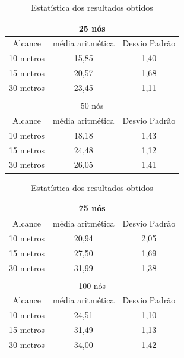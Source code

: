 	\begin{table}[!htb]
	    \caption{Estatística dos resultados obtidos}
	    \label{tab:estatiscaResultadosObtidosComInfraestrutura}
	    \centering
	    \scriptsize
	    \begin{minipage}{.5\linewidth}
	      
	      \centering
	        \begin{tabular}{|c|c|c|}

			\hline
			\multicolumn{3}{|c|}{25 nós} \\ \hline
			Alcance   & média aritmética &	Desvio Padrão   \\ \hline
			10 metros &	15,85 & 1,40   \\ \hline
			15 metros &	20,57 & 1,68   \\ \hline
			30 metros &	23,45 & 1,11  \\ \hline

			\multicolumn{3}{|c|}{} \\ \hline

			\multicolumn{3}{|c|}{50 nós} \\ \hline
			Alcance   & média aritmética &	Desvio Padrão   \\ \hline
			10 metros &	18,18 & 1,43   \\ \hline
			15 metros &	24,48 & 1,12  \\ \hline
			30 metros &	26,05 & 1,41  \\ \hline

		\end{tabular}
	    \end{minipage}%
	    \begin{minipage}{.5\linewidth}
	      \centering
	        \begin{tabular}{|c|c|c|}
	        \hline
			\multicolumn{3}{|c|}{75 nós} \\ \hline
			Alcance   & média aritmética &	Desvio Padrão   \\ \hline
			10 metros &	20,94 & 2,05   \\ \hline
			15 metros &	27,50 & 1,69   \\ \hline
			30 metros &	31,99 & 1,38 \\ \hline

			\multicolumn{3}{|c|}{} \\ \hline


			\multicolumn{3}{|c|}{100 nós} \\ \hline
			Alcance   & média aritmética &	Desvio Padrão   \\ \hline
			10 metros &	24,51 & 1,10   \\ \hline
			15 metros &	31,49 & 1,13   \\ \hline
			30 metros &	34,00 & 1,42  \\ \hline

		\end{tabular}

	    \end{minipage} 
	\end{table} 
